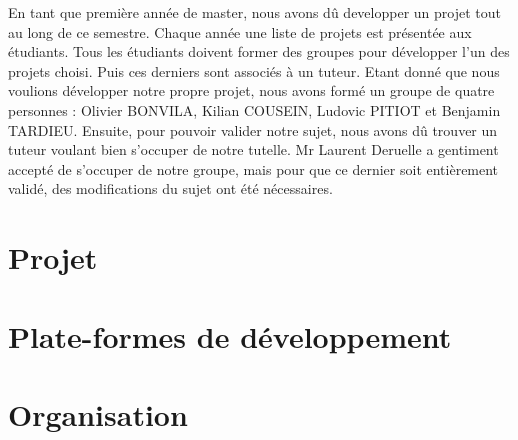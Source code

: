 En tant que première année de master, nous avons dû developper un projet tout au long de ce semestre. Chaque année une liste de projets est présentée aux étudiants. Tous les étudiants doivent former des groupes pour développer l'un des projets choisi. Puis ces derniers sont associés à un tuteur. Etant donné que nous voulions développer notre propre projet, nous avons formé un groupe de quatre personnes : Olivier BONVILA, Kilian COUSEIN, Ludovic PITIOT et Benjamin TARDIEU. Ensuite, pour pouvoir valider notre sujet, nous avons dû trouver un tuteur voulant bien s'occuper de notre tutelle. Mr Laurent Deruelle a gentiment accepté de s'occuper de notre groupe, mais pour que ce dernier soit entièrement validé, des modifications du sujet ont été nécessaires.

\section{Projet}	
	

\section{Plate-formes de développement}
	
	
\section{Organisation}
	
